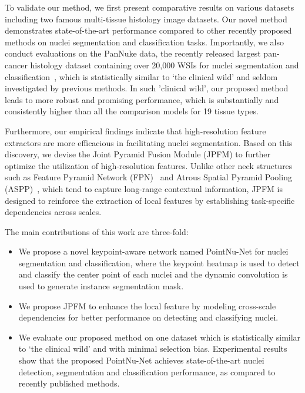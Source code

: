 \documentclass[lettersize,journal]{IEEEtran}
\begin{document}
To validate our method, we first present comparative results on various datasets including two famous multi-tissue histology image datasets. Our novel method demonstrates state-of-the-art performance compared to other recently proposed methods on nuclei segmentation and classification tasks. Importantly, we also conduct evaluations on the PanNuke data, the recently released largest pan-cancer histology dataset containing over 20,000 WSIs for nuclei segmentation and classification~\cite{gamper2020pannuke}, which is statistically similar to ‘the clinical wild’ and seldom investigated by previous methods. In such 'clinical wild', our proposed method leads to more robust and promising performance, which is substantially and consistently higher than all the comparison models for 19 tissue types.

Furthermore, our empirical findings indicate that high-resolution feature extractors are more efficacious in facilitating nuclei segmentation. Based on this discovery, we devise the Joint Pyramid Fusion Module (JPFM) to further optimize the utilization of high-resolution features. Unlike other neck structures such as Feature Pyramid Network (FPN)~\cite{fpn} and Atrous Spatial Pyramid Pooling (ASPP)~\cite{chen2017deeplab}, which tend to capture long-range contextual information, JPFM is designed to reinforce the extraction of local features by establishing task-specific dependencies across scales.

The main contributions of this work are three-fold: 
\begin{itemize}
\setlength{\itemsep}{0pt}
\setlength{\parsep}{0pt}
\setlength{\parskip}{0pt}
\item We propose a novel keypoint-aware network named PointNu-Net for nuclei segmentation and classification, where the keypoint heatmap is used to detect and classify the center point of each nuclei and the dynamic convolution is used to generate instance segmentation mask.
\item We propose JPFM to enhance the local feature by modeling cross-scale dependencies for better performance on detecting and classifying nuclei.
\item We evaluate our proposed method on one dataset which is statistically similar to ‘the clinical wild’ and with minimal selection bias. Experimental results show that the proposed PointNu-Net achieves state-of-the-art nuclei detection, segmentation and classification performance, as compared to recently published methods.
\end{itemize}
\end{document}
